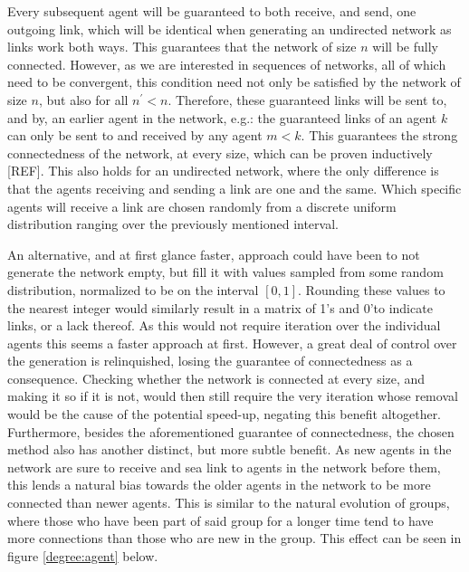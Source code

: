 \documentclass{article}
\begin{document}
Every subsequent agent will be guaranteed to both receive, and send, one outgoing link, which will be identical when generating an undirected network as links work both ways. This guarantees that the network of size $n$ will be fully connected. However, as we are interested in sequences of networks, all of which need to be convergent, this condition need not only be satisfied by the network of size $n$, but also for all $n^{\prime} < n$. Therefore, these guaranteed links will be sent to, and by, an earlier agent in the network, e.g.: the guaranteed links of an agent $k$ can only be sent to and received by any agent $m < k$. This guarantees the strong connectedness of the network, at every size, which can be proven inductively [REF]. This also holds for an undirected network, where the only difference is that the agents receiving and sending a link are one and the same. Which specific agents will receive a link are chosen randomly from a discrete uniform distribution ranging over the previously mentioned interval. \newpage 

An alternative, and at first glance faster, approach could have been to not generate the network empty, but fill it with values sampled from some random distribution, normalized to be on the interval $[0, 1]$. Rounding these values to the nearest integer would similarly result in a matrix of 1's and 0'to indicate links, or a lack thereof. As this would not require iteration over the individual agents this seems a faster approach at first. However, a great deal of control over the generation is relinquished, losing the guarantee of connectedness as a consequence. Checking whether the network is connected at every size, and making it so if it is not, would then still require the very iteration whose removal would be the cause of the potential speed-up, negating this benefit altogether. Furthermore, besides the aforementioned guarantee of connectedness, the chosen method also has another distinct, but more subtle benefit. As new agents in the network are sure to receive and se\belvecnd a link to agents in the network before them, this lends a natural bias towards the older agents in the network to be more connected than newer agents. This is similar to the natural evolution of groups, where those who have been part of said group for a longer time tend to have more connections than those who are new in the group. This effect can be seen in figure \ref{degree:agent} below.
\end{document}
